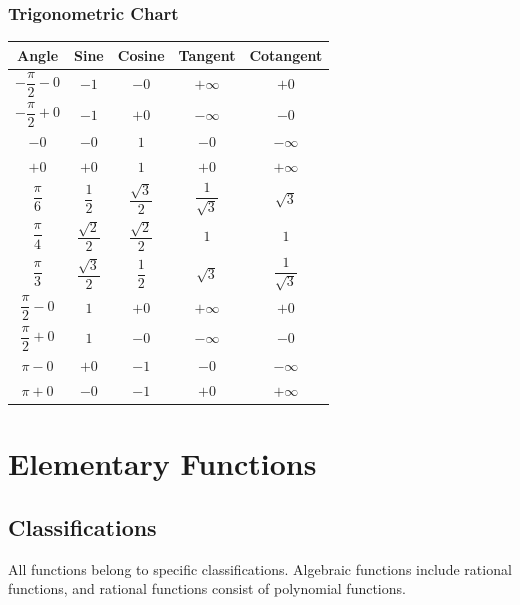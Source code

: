 \documentclass[a4paper,12pt,openany]{book}
\begin{document}
\subsection{Trigonometric Chart}
\begingroup
\linespread{2}\selectfont  %

\begin{table}[h!]
\centering
\begin{tabular}{|c|c|c|c|c|}
\hline
\textbf{Angle} & \textbf{Sine} & \textbf{Cosine} & \textbf{Tangent} & \textbf{Cotangent} \\
\hline
$-\dfrac{\pi}{2} - 0$ & $-1$ & $-0$ & $+\infty$ & $+0$ \\
$-\dfrac{\pi}{2} + 0$ & $-1$ & $+0$ & $-\infty$ & $-0$ \\
$-0$ & $-0$ & $1$ & $-0$ & $-\infty$ \\
$+0$ & $+0$ & $1$ & $+0$ & $+\infty$ \\
$\dfrac{\pi}{6}$ & $\dfrac{1}{2}$ & $\dfrac{\sqrt{3}}{2}$ & $\dfrac{1}{\sqrt{3}}$ & $\sqrt{3}$ \\
$\dfrac{\pi}{4}$ & $\dfrac{\sqrt{2}}{2}$ & $\dfrac{\sqrt{2}}{2}$ & $1$ & $1$ \\
$\dfrac{\pi}{3}$ & $\dfrac{\sqrt{3}}{2}$ & $\dfrac{1}{2}$ & $\sqrt{3}$ & $\dfrac{1}{\sqrt{3}}$ \\
$\dfrac{\pi}{2} - 0$ & $1$ & $+0$ & $+\infty$ & $+0$ \\
$\dfrac{\pi}{2} + 0$ & $1$ & $-0$ & $-\infty$ & $-0$ \\
$\pi - 0$ & $+0$ & $-1$ & $-0$ & $-\infty$ \\
$\pi + 0$ & $-0$ & $-1$ & $+0$ & $+\infty$ \\
\hline
\end{tabular}
\end{table}

\endgroup

\chapter{Elementary Functions}

\section{Classifications}
All functions belong to specific classifications. Algebraic functions include rational functions, and rational functions consist of polynomial functions.
\end{document}
